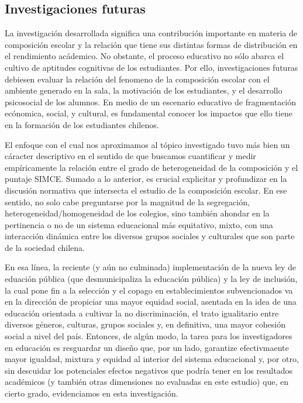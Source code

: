 \documentclass[
]{article}
\begin{document}
\hypertarget{investigaciones-futuras}{%
\subsection{Investigaciones futuras}\label{investigaciones-futuras}}

La investigación desarrollada significa una contribución importante en
materia de composición escolar y la relación que tiene sus distintas
formas de distribución en el rendimiento acádemico. No obstante, el
proceso educativo no sólo abarca el cultivo de aptitudes cognitivas de
los estudiantes. Por ello, investigaciones futuras debiesen evaluar la
relación del fenomeno de la composición escolar con el ambiente generado
en la sala, la motivación de los estudiantes, y el desarrollo
psicosocial de los alumnos. En medio de un escenario educativo de
fragmentación ecónomica, social, y cultural, es fundamental conocer los
impactos que ello tiene en la formación de los estudiantes chilenos.

El enfoque con el cual nos aproximamos al tópico investigado tuvo más
bien un cáracter descriptivo en el sentido de que buscamos cuantificar y
medir empíricamente la relación entre el grado de heterogeneidad de la
composición y el puntaje SIMCE. Sumado a lo anterior, es crucial
explicitar y profundizar en la discusión normativa que intersecta el
estudio de la composición escolar. En ese sentido, no solo cabe
preguntarse por la magnitud de la segregación,
heterogeneidad/homogeneidad de los colegios, sino también ahondar en la
pertinencia o no de un sistema educacional más equitativo, mixto, con
una interacción dinámica entre los diversos grupos sociales y culturales
que son parte de la sociedad chilena.

En esa línea, la reciente (y aún no culminada) implementación de la
nueva ley de eduación pública (que desmunicipaliza la educación pública)
y la ley de inclusión, la cual pone fin a la selección y el copago en
establecimientos subvencionados va en la dirección de propiciar una
mayor equidad social, asentada en la idea de una educación orientada a
cultivar la no discriminación, el trato igualitario entre diversos
géneros, culturas, grupos sociales y, en definitiva, una mayor cohesión
social a nivel del país. Entonces, de algún modo, la tarea para los
investigadores en educación es resguardar un diseño que, por un lado,
garantize efectivmaente mayor igualdad, mixtura y equidad al interior
del sistema educacional y, por otro, sin descuidar los potenciales
efectos negativos que podría tener en los resultados académicos (y
también otras dimensiones no evaluadas en este estudio) que, en cierto
grado, evidenciamos en esta investigación.
\end{document}
